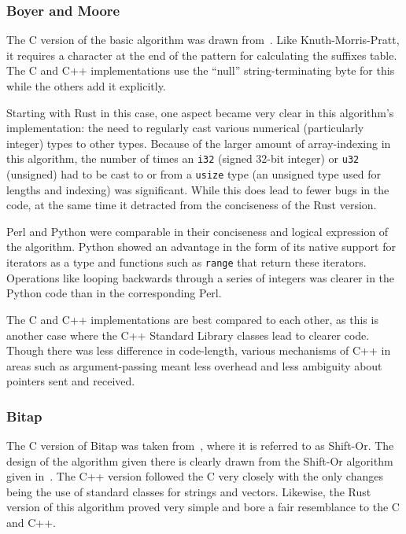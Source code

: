 \subsubsection{Boyer and Moore}

The C version of the basic algorithm was drawn from~\cite[Chapter 14]{handbook.2004}. Like Knuth-Morris-Pratt, it requires a character at the end of the pattern for calculating the suffixes table. The C and C++ implementations use the ``null'' string-terminating byte for this while the others add it explicitly.

Starting with Rust in this case, one aspect became very clear in this algorithm's implementation: the need to regularly cast various numerical (particularly integer) types to other types. Because of the larger amount of array-indexing in this algorithm, the number of times an \texttt{i32} (signed 32-bit integer) or \texttt{u32} (unsigned) had to be cast to or from a \texttt{usize} type (an unsigned type used for lengths and indexing) was significant. While this does lead to fewer bugs in the code, at the same time it detracted from the conciseness of the Rust version.

Perl and Python were comparable in their conciseness and logical expression of the algorithm. Python showed an advantage in the form of its native support for iterators as a type and functions such as \texttt{range} that return these iterators. Operations like looping backwards through a series of integers was clearer in the Python code than in the corresponding Perl.

The C and C++ implementations are best compared to each other, as this is another case where the C++ Standard Library classes lead to clearer code. Though there was less difference in code-length, various mechanisms of C++ in areas such as argument-passing meant less overhead and less ambiguity about pointers sent and received.

\subsubsection{Bitap}

The C version of Bitap was taken from~\cite[Chapter 5]{handbook.2004}, where it is referred to as Shift-Or. The design of the algorithm given there is clearly drawn from the Shift-Or algorithm given in~\cite{baeza.yates.gonnet.1992}. The C++ version followed the C very closely with the only changes being the use of standard classes for strings and vectors. Likewise, the Rust version of this algorithm proved very simple and bore a fair resemblance to the C and C++.

